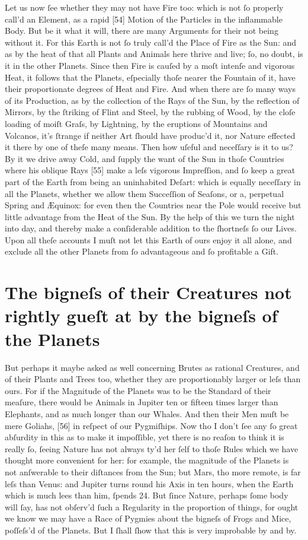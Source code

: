 \documentclass[letterpaper]{book}
\begin{document}
Let us now ſee whether they may not have Fire too: which is not ſo properly
call'd an Element, as a rapid [54] Motion of the Particles in the
inflammable Body. But be it what it will, there are many Arguments for their
not being without it. For this Earth is not ſo truly call'd the Place of
Fire as the Sun: and as by the heat of that all Plants and Animals here
thrive and live; ſo, no doubt, is it in the other Planets. Since then Fire
is cauſed by a moſt intenſe and vigorous Heat, it follows that the Planets,
eſpecially thoſe nearer the Fountain of it, have their proportionate degrees
of Heat and Fire. And when there are ſo many ways of its Production, as by
the collection of the Rays of the Sun, by the reflection of Mirrors, by the
ſtriking of Flint and Steel, by the rubbing of Wood, by the cloſe loading of
moiſt Graſs, by Lightning, by the eruptions of Mountains and Volcanos, it's
ſtrange if neither Art ſhould have produc'd it, nor Nature effected it there
by one of theſe many means.  Then how uſeful and neceſſary is it to us? By
it we drive away Cold, and ſupply the want of the Sun in thoſe Countries
where his oblique Rays [55] make a leſs vigorous Impreſſion, and ſo keep a
great part of the Earth from being an uninhabited Deſart: which is equally
neceſſary in all the Planets, whether we allow them Succeſſion of Seaſons,
or a, perpetual Spring and Æquinox: for even then the Countries near the
Pole would receive but little advantage from the Heat of the Sun. By the
help of this we turn the night into day, and thereby make a conſiderable
addition to the ſhortneſs ſo our Lives. Upon all theſe accounts I muſt not
let this Earth of ours enjoy it all alone, and exclude all the other Planets
from ſo advantageous and ſo profitable a Gift.


\section{The bigneſs of their Creatures not rightly gueſt at by the bigneſs
of the Planets}

But perhaps it maybe asked as well concerning Brutes as rational Creatures,
and of their Plants and Trees too, whether they are proportionably larger or
leſs than ours. For if the Magnitude of the Planets was to be the Standard
of their meaſure, there would be Animals in Jupiter ten or fifteen times
larger than Elephants, and as much longer than our Whales. And then their
Men muſt be mere Goliahs, [56] in reſpect of our Pygmiſhips. Now tho I don't
ſee any ſo great abſurdity in this as to make it impoſſible, yet there is no
reaſon to think it is really ſo, ſeeing Nature has not always ty'd her ſelf
to thoſe Rules which we have thought more convenient for her: for example,
the magnitude of the Planets is not anſwerable to their diſtances from the
Sun; but Mars, tho more remote, is far leſs than Venus: and Jupiter turns
round his Axis in ten hours, when the Earth which is much lees than him,
ſpends 24. But ſince Nature, perhaps ſome body will ſay, has not obſerv'd
ſuch a Regularity in the proportion of things, for ought we know we may have a
Race of Pygmies about the bigneſs of Frogs and Mice, poſſeſs'd of the
Planets. But I ſhall ſhow that this is very improbable by and by.
\end{document}
